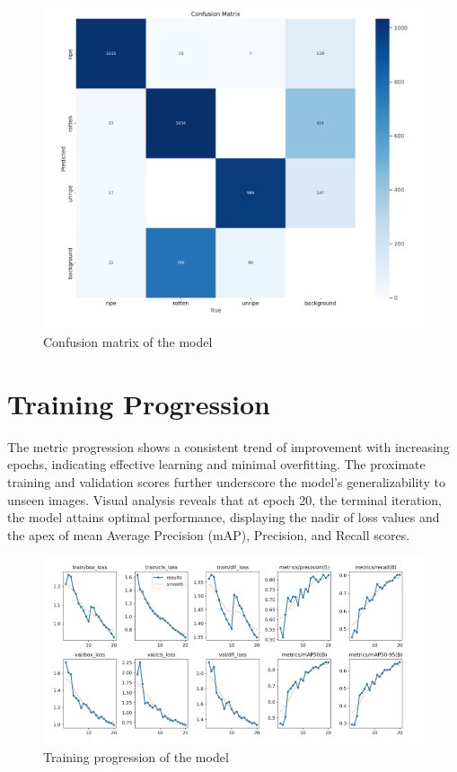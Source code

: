 {    \begin{figure}[H]
    \centering
    \includegraphics[scale=0.8]{Figures/confusion_matrix.png}
    \caption{Confusion matrix of the model}
    \label{fig:figure-09}
\end{figure}

\section{Training Progression}
The metric progression shows a consistent trend of improvement with increasing epochs, indicating effective learning and minimal overfitting. The proximate training and validation scores further underscore the model's generalizability to unseen images. Visual analysis reveals that at epoch 20, the terminal iteration, the model attains optimal performance, displaying the nadir of loss values and the apex of mean Average Precision (mAP), Precision, and Recall scores.

    \begin{figure}[H]
    \centering
    \includegraphics[scale=0.8]{Figures/training.png}
    \caption{Training progression of the model}
    \label{fig:figure-10}
\end{figure}


}
